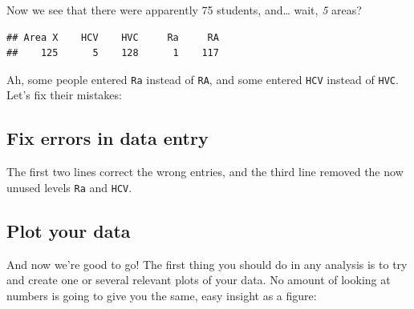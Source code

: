 \documentclass[
]{book}
\newenvironment{Shaded}{\begin{snugshade}}{\end{snugshade}}
\newcommand{\KeywordTok}[1]{\textcolor[rgb]{0.13,0.29,0.53}{\textbf{#1}}}
\newcommand{\NormalTok}[1]{#1}
\newcommand{\OperatorTok}[1]{\textcolor[rgb]{0.81,0.36,0.00}{\textbf{#1}}}
\newcommand{\StringTok}[1]{\textcolor[rgb]{0.31,0.60,0.02}{#1}}
\begin{document}
Now we see that there were apparently 75 students, and\ldots{} wait, \emph{5} areas?

\begin{Shaded}
\end{Shaded}

\begin{verbatim}
## Area X    HCV    HVC     Ra     RA 
##    125      5    128      1    117
\end{verbatim}

Ah, some people entered \texttt{Ra} instead of \texttt{RA}, and some entered \texttt{HCV} instead of \texttt{HVC}. Let's fix their mistakes:

\hypertarget{fix-errors-in-data-entry}{%
\subsection{Fix errors in data entry}\label{fix-errors-in-data-entry}}

\begin{Shaded}
\end{Shaded}

The first two lines correct the wrong entries, and the third line removed the now unused levels \texttt{Ra} and \texttt{HCV}.

\hypertarget{plot-your-data}{%
\subsection{Plot your data}\label{plot-your-data}}

And now we're good to go! The first thing you should do in any analysis is to try and create one or several relevant plots of your data. No amount of looking at numbers is going to give you the same, easy insight as a figure:
\end{document}
